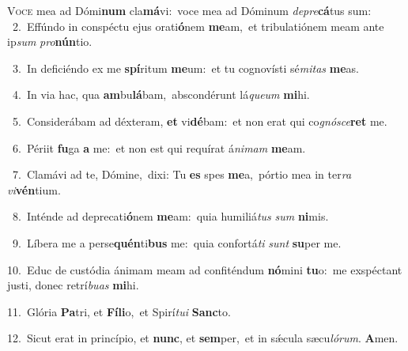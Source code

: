 \lettrine{\initial\textcolor{\initialcolor}{V}}{oce} mea ad Dómi\textbf{num} cla\-\textbf{má}\-vi:~\star voce mea ad Dóminum \textit{de}\-\textit{pre}\textbf{cá}tus sum:\\
{\numbfont\textcolor{\numbcolor}{~2.}}~Effúndo in conspéctu ejus orati\-\textbf{ó}\-nem \textbf{me}\-am,~\star et tribulatiónem meam ante ip\textit{sum} \textit{pro}\-\textbf{nún}tio.\par
{\numbfont\textcolor{\numbcolor}{~3.}}~In deficiéndo ex me \textbf{spí}\-ritum \textbf{me}\-um:~\star et tu cognovísti sé\-\textit{mi}\-\textit{tas} \textbf{me}\-as.\par
{\numbfont\textcolor{\numbcolor}{~4.}}~In via hac, qua \textbf{am}\-bu\-\textbf{lá}\-bam,~\star abscondérunt lá\-\textit{que}\-\textit{um} \textbf{mi}\-hi.\par
{\numbfont\textcolor{\numbcolor}{~5.}}~Considerábam ad déxteram, \textbf{et} vi\-\textbf{dé}\-bam:~\star et non erat qui co\-\textit{gnó}\-\textit{sce}\textbf{ret} me.\par
{\numbfont\textcolor{\numbcolor}{~6.}}~Périit \textbf{fu}\-ga \textbf{a} me:~\star et non est qui requírat á\-\textit{ni}\-\textit{mam} \textbf{me}\-am.\par
{\numbfont\textcolor{\numbcolor}{~7.}}~Clamávi ad te, Dómine,~\dagger dixi: Tu \textbf{es} spes \textbf{me}\-a,~\star pórtio mea in ter\textit{ra} \textit{vi}\-\textbf{vén}tium.\par
{\numbfont\textcolor{\numbcolor}{~8.}}~Inténde ad deprecati\-\textbf{ó}\-nem \textbf{me}\-am:~\star quia humiliá\textit{tus} \textit{sum} \textbf{ni}\-mis.\par
{\numbfont\textcolor{\numbcolor}{~9.}}~Líbera me a perse\-\textbf{quén}\-ti\textbf{bus} me:~\star quia confortá\textit{ti} \textit{sunt} \textbf{su}\-per me.\par
{\numbfont\textcolor{\numbcolor}{10.}}~Educ de custódia ánimam meam ad confiténdum \textbf{nó}\-mini \textbf{tu}\-o:~\star me exspéctant justi, donec retrí\-\textit{bu}\-\textit{as} \textbf{mi}\-hi.\par
{\numbfont\textcolor{\numbcolor}{11.}}~Glória \textbf{Pa}\-tri, et \textbf{Fí}\-\textbf{li}o,~\star et Spirí\-\textit{tu}\-\textit{i} \textbf{Sanc}\-to.\par
{\numbfont\textcolor{\numbcolor}{12.}}~Sicut erat in princípio, et \textbf{nunc}\-, et \textbf{sem}\-per,~\star et in sǽcula sæcu\-\textit{ló}\-\textit{rum}. \textbf{A}\-men.\par
